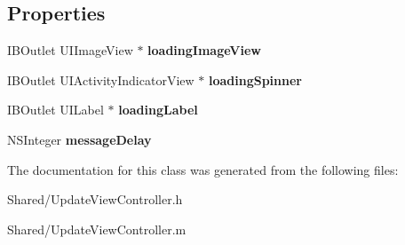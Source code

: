 \subsection*{Properties}
\begin{DoxyCompactItemize}
\item 
\hypertarget{interface_update_view_controller_ab245f2e649c1075bec585c5290277f9c}{
IBOutlet UIImageView $\ast$ {\bfseries loadingImageView}}
\label{interface_update_view_controller_ab245f2e649c1075bec585c5290277f9c}

\item 
\hypertarget{interface_update_view_controller_a20d3f43c1efa6516b63fcd23a2161704}{
IBOutlet UIActivityIndicatorView $\ast$ {\bfseries loadingSpinner}}
\label{interface_update_view_controller_a20d3f43c1efa6516b63fcd23a2161704}

\item 
\hypertarget{interface_update_view_controller_a8ff0c6ca487d4240fe0f09ba52e35ad2}{
IBOutlet UILabel $\ast$ {\bfseries loadingLabel}}
\label{interface_update_view_controller_a8ff0c6ca487d4240fe0f09ba52e35ad2}

\item 
\hypertarget{interface_update_view_controller_afde7d2b665260fd74858f85c721c248f}{
NSInteger {\bfseries messageDelay}}
\label{interface_update_view_controller_afde7d2b665260fd74858f85c721c248f}

\end{DoxyCompactItemize}


The documentation for this class was generated from the following files:\begin{DoxyCompactItemize}
\item 
Shared/UpdateViewController.h\item 
Shared/UpdateViewController.m\end{DoxyCompactItemize}
